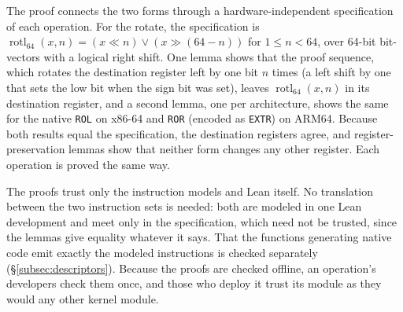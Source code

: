 The proof connects the two forms through a hardware-independent specification of each operation.
For the \lang rotate, the specification is $\operatorname{rotl}_{64}(x,n)=(x\ll n)\lor(x\gg(64-n))$ for $1\leq n<64$, over 64-bit bit-vectors with a logical right shift.
One lemma shows that the proof sequence, which rotates the destination register left by one bit $n$ times (a left shift by one that sets the low bit when the sign bit was set), leaves $\operatorname{rotl}_{64}(x,n)$ in its destination register, and a second lemma, one per architecture, shows the same for the native \texttt{ROL} on x86-64 and \texttt{ROR} (encoded as \texttt{EXTR}) on ARM64.
Because both results equal the specification, the destination registers agree, and register-preservation lemmas show that neither form changes any other register.
Each \lang operation is proved the same way.

The proofs trust only the instruction models and Lean itself.
No translation between the two instruction sets is needed: both are modeled in one Lean development and meet only in the specification, which need not be trusted, since the lemmas give equality whatever it says.
That the functions generating native code emit exactly the modeled instructions is checked separately (\S\ref{subsec:descriptors}).
Because the proofs are checked offline, an operation's developers check them once, and those who deploy it trust its module as they would any other kernel module.

